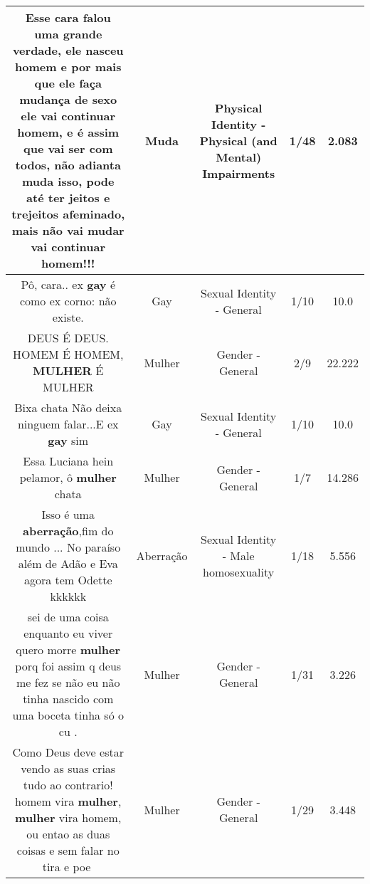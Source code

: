 \documentclass[11pt]{article}
\newlength\mylength
\begin{document}
\begin{center}
\begin{longtable}{|C{.65\mylength}|C{.30\mylength}|C{.12\mylength}|C{.12\mylength}|C{.12\mylength}|}
  \small Esse cara falou uma grande verdade, ele nasceu homem e por mais que ele faça mudança de sexo ele vai continuar homem, e é assim que vai ser com todos, não adianta \textbf{muda} isso, pode até ter jeitos e trejeitos afeminado, mais não vai mudar vai continuar homem!!!\normalsize   & Muda & Physical Identity - Physical (and Mental) Impairments & 1/48 & 2.083 \\  \hline
  \small Pô, cara.. ex \textbf{gay} é como ex corno: não existe.\normalsize   & Gay & Sexual Identity - General & 1/10 & 10.0 \\  \hline
  \small DEUS É DEUS. HOMEM É HOMEM, \textbf{MULHER} É MULHER\normalsize   & Mulher & Gender - General & 2/9 & 22.222 \\  \hline
  \small Bixa chata Não deixa ninguem falar...E ex \textbf{gay} sim\normalsize   & Gay & Sexual Identity - General & 1/10 & 10.0 \\  \hline
  \small Essa Luciana hein pelamor, ô \textbf{mulher} chata\normalsize   & Mulher & Gender - General & 1/7 & 14.286 \\  \hline
  \small Isso é uma \textbf{aberração},fim do mundo ... No paraíso além de Adão e Eva agora tem Odette kkkkkk\normalsize   & Aberração & Sexual Identity - Male homosexuality & 1/18 & 5.556 \\  \hline
  \small sei de uma coisa enquanto eu viver quero morre \textbf{mulher} porq foi assim q deus me fez se não eu não tinha nascido com uma boceta tinha só o cu .\normalsize   & Mulher & Gender - General & 1/31 & 3.226 \\  \hline
  \small Como Deus deve estar vendo as suas crias tudo ao contrario! homem vira \textbf{mulher}, \textbf{mulher} vira homem, ou entao as duas coisas  e sem falar no tira e poe🤢\normalsize   & Mulher & Gender - General & 1/29 & 3.448 \\  \hline

\end{longtable}
\end{center}
\end{document}

